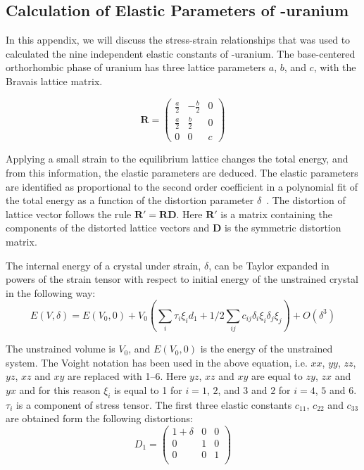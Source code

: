 \begin{appendices}

\section{Calculation of Elastic Parameters of \textalpha-uranium}\label{appen_elalpha}
In this appendix, we will discuss the stress-strain relationships that was used to calculated the nine independent elastic constants of \textalpha-uranium. The base-centered orthorhombic phase of uranium has three lattice parameters $a$, $b$, and $c$, with the Bravais lattice matrix.

\begin{equation}\label{eq_lattic_alphaU}
\mathbf{R} = \begin{pmatrix}
			\frac{a}{2} & -\frac{b}{2} & 0 \\
			\frac{a}{2} & \frac{b}{2} & 0 \\
			0			&    0        & c 
			\end{pmatrix}
\end{equation}

Applying a small strain to the equilibrium lattice changes the total energy, and from this information, the elastic parameters are deduced. The elastic parameters are identified as proportional to the second order coefficient in a polynomial fit of the total energy as a function of the distortion parameter $\delta$~\cite{wallace1998thermodynamics}. The distortion of lattice vector follows the rule $\mathbf{R'}=\mathbf{RD}$. Here $\mathbf{R'}$ is a matrix containing the components of the distorted lattice vectors and $\mathbf{D}$ is the symmetric distortion matrix.



The internal energy of a crystal under strain, $\delta$, can be Taylor expanded in powers of the strain tensor with respect to initial energy of the unstrained crystal in the following way:
	\begin{equation}
	\label{eq_taylor_el}
	E(V,\delta) = E(V_0,0) + V_0 \left ( \sum_i \tau_i \xi_i d_1 + 1/2 \sum_{ij} c_{ij} \delta_i \xi_i \delta_j \xi_j \right ) + O(\delta^3) 
	\end{equation}

The unstrained volume is $V_0$, and $E(V_0,0)$ is the energy of the unstrained system. The Voight notation has been used in the above equation, i.e. $xx$, $yy$, $zz$, $yz$, $xz$ and $xy$ are replaced with 1--6. Here $yz$, $xz$ and $xy$ are equal to $zy$, $zx$ and $yx$ and for this reason $\xi_i$ is equal to 1 for $i=1$, $2$, and $3$ and $2$ for $i=4$, $5$ and $6$. $\tau_i$ is a component of stress tensor. The first three elastic constants $c_{11}$, $c_{22}$ and $c_{33}$ are obtained form the following distortions:
\begin{equation}
\label{eq_D1}
	D_1 =  \begin{pmatrix}
						1+\delta & 0 & 0 \\
						0 & 1 & 0 \\
						0 & 0 & 1 \\
						\end{pmatrix}
\end{equation}


\end{appendices}

